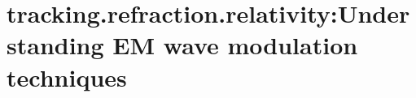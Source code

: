 \section{ tracking.refraction.relativity:Understanding EM wave modulation techniques }\label{sec:q1}    
